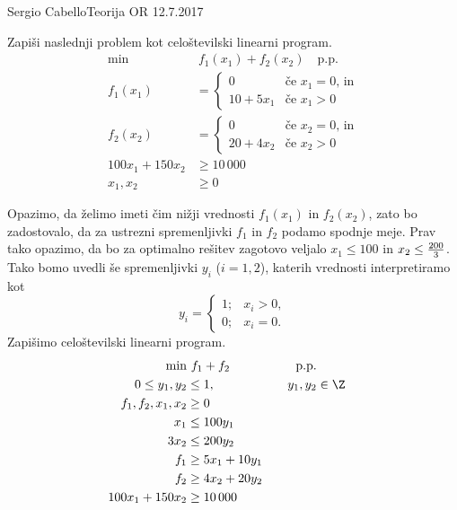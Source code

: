 \begin{naloga}{Sergio Cabello}{Teorija OR 12.7.2017}
\begin{vprasanje}
Zapiši naslednji problem kot celoštevilski linearni program.
\begin{align*}
\min &\ f_1(x_1) + f_2(x_2) \quad \text{p.p.} \\
f_1(x_1) &= \begin{cases}
            0         & \text{če $x_1 = 0$, in} \\
            10 + 5x_1 & \text{če $x_1 > 0$}
            \end{cases} \\
f_2(x_2) &= \begin{cases}
            0         & \text{če $x_2 = 0$, in} \\
            20 + 4x_2 & \text{če $x_2 > 0$}
            \end{cases} \\
100x_1 + 150x_2 &\ge 10\,000 \\
x_1, x_2 &\ge 0
\end{align*}
\end{vprasanje}

\begin{odgovor}
Opazimo, da želimo imeti čim nižji vrednosti $f_1(x_1)$ in $f_2(x_2)$,
zato bo zadostovalo,
da za ustrezni spremenljivki $f_1$ in $f_2$ podamo spodnje meje.
Prav tako opazimo,
da bo za optimalno rešitev zagotovo veljalo
$x_1 \le 100$ in $x_2 \le {200 \over 3}$.
Tako bomo uvedli še spremenljivki $y_i$ ($i = 1, 2$),
katerih vrednosti interpretiramo kot
$$
y_i = \begin{cases}
1; & x_i > 0, \\
0; & x_i = 0.
\end{cases}
$$
Zapišimo celoštevilski linearni program.
\begin{alignat*}{2}
\min &\ f_1 + f_2 &\quad \text{p.p.} \\
0 \le y_1, y_2 &\le 1, &\quad y_1, y_2 &\in \Z \\
f_1, f_2, x_1, x_2 &\ge 0 \\
x_1 &\le 100 y_1 \\
3 x_2 &\le 200 y_2 \\
f_1 &\ge 5 x_1 + 10 y_1 \\
f_2 &\ge 4 x_2 + 20 y_2 \\
100 x_1 + 150 x_2 &\ge 10\,000
\end{alignat*}
\end{odgovor}
\end{naloga}
